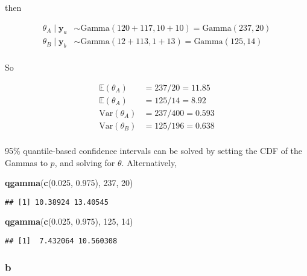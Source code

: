 \documentclass[]{article}
\newenvironment{Shaded}{\begin{snugshade}}{\end{snugshade}}
\newcommand{\DecValTok}[1]{\textcolor[rgb]{0.00,0.00,0.81}{#1}}
\newcommand{\FloatTok}[1]{\textcolor[rgb]{0.00,0.00,0.81}{#1}}
\newcommand{\KeywordTok}[1]{\textcolor[rgb]{0.13,0.29,0.53}{\textbf{#1}}}
\newcommand{\NormalTok}[1]{#1}
\begin{document}
then

\begin{align}
\theta_A \mid \mathbf{y}_a &\sim \text{Gamma}(120 + 117, 10 + 10) = \text{Gamma}(237, 20) \\
\theta_B \mid \mathbf{y}_b &\sim \text{Gamma}(12 + 113, 1 + 13) = \text{Gamma}(125, 14) \\
\end{align}

So

\begin{align}
\mathbb{E}(\theta_A) &=  237/20 = 11.85\\
\mathbb{E}(\theta_A) &= 125/14 = 8.92\\
\text{Var}(\theta_A) &= 237/400 = 0.593\\
\text{Var}(\theta_B) &= 125/196 = 0.638\\
\end{align}

95\% quantile-based confidence intervals can be solved by setting the
CDF of the Gammas to \(p\), and solving for \(\theta\). Alternatively,

\begin{Shaded}
\begin{Highlighting}[]
\KeywordTok{qgamma}\NormalTok{(}\KeywordTok{c}\NormalTok{(}\FloatTok{0.025}\NormalTok{, }\FloatTok{0.975}\NormalTok{), }\DecValTok{237}\NormalTok{, }\DecValTok{20}\NormalTok{)}
\end{Highlighting}
\end{Shaded}

\begin{verbatim}
## [1] 10.38924 13.40545
\end{verbatim}

\begin{Shaded}
\begin{Highlighting}[]
\KeywordTok{qgamma}\NormalTok{(}\KeywordTok{c}\NormalTok{(}\FloatTok{0.025}\NormalTok{, }\FloatTok{0.975}\NormalTok{), }\DecValTok{125}\NormalTok{, }\DecValTok{14}\NormalTok{)}
\end{Highlighting}
\end{Shaded}

\begin{verbatim}
## [1]  7.432064 10.560308
\end{verbatim}

\hypertarget{b-1}{%
\subsubsection{b}\label{b-1}}
\end{document}
